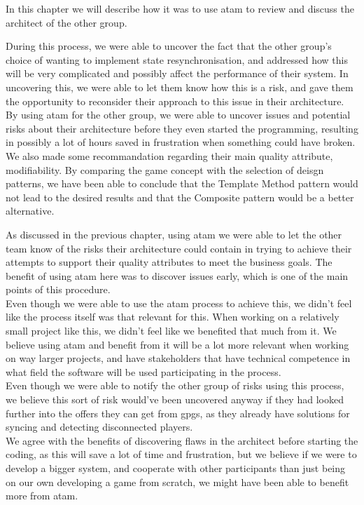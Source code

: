 In this chapter we will describe how it was to use \gls{atam} to review and discuss the architect of the other group.

During this process, we were able to uncover the fact that the other group's choice of wanting to implement state resynchronisation, and addressed how this will be very complicated and possibly affect the performance of their system. In uncovering this, we were able to let them know how this is a risk, and gave them the opportunity to reconsider their approach to this issue in their architecture. By using \gls{atam} for the other group, we were able to uncover issues and potential risks about their architecture before they even started the programming, resulting in possibly a lot of hours saved in frustration when something could have broken. \\

We also made some recommandation regarding their main quality attribute, modifiability. By comparing the game concept with the selection of deisgn patterns, we have been able to conclude that the Template Method pattern would not lead to the desired results and that the Composite pattern would be a better alternative.

As discussed in the previous chapter, using \gls{atam} we were able to let the other team know of the risks their architecture could contain in trying to achieve their attempts to support their quality attributes to meet the business goals. The benefit of using \gls{atam} here was to discover issues early, which is one of the main points of this procedure.\\

Even though we were able to use the \gls{atam} process to achieve this, we didn't feel like the process itself was that relevant for this. When working on a relatively small project like this, we didn't feel like we benefited that much from it. We believe using \gls{atam} and benefit from it will be a lot more relevant when working on way larger projects, and have stakeholders that have technical competence in what field the software will be used participating in the process. \\

Even though we were able to notify the other group of risks using this process, we believe this sort of risk would've been uncovered anyway if they had looked further into the offers they can get from \gls{gpgs}, as they already have solutions for syncing and detecting disconnected players. \\

We agree with the benefits of discovering flaws in the architect before starting the coding, as this will save a lot of time and frustration, but we believe if we were to develop a bigger system, and cooperate with other participants than just being on our own developing a game from scratch, we might have been able to benefit more from \gls{atam}.
